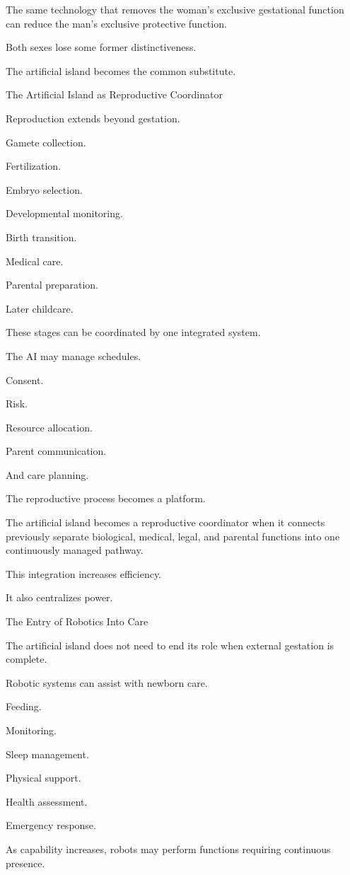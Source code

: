 The same technology that removes the woman’s exclusive gestational function can reduce the man’s exclusive protective function.

Both sexes lose some former distinctiveness.

The artificial island becomes the common substitute.

The Artificial Island as Reproductive Coordinator

Reproduction extends beyond gestation.

Gamete collection.

Fertilization.

Embryo selection.

Developmental monitoring.

Birth transition.

Medical care.

Parental preparation.

Later childcare.

These stages can be coordinated by one integrated system.

The AI may manage schedules.

Consent.

Risk.

Resource allocation.

Parent communication.

And care planning.

The reproductive process becomes a platform.

The artificial island becomes a reproductive coordinator when it connects previously separate biological, medical, legal, and parental functions into one continuously managed pathway.

This integration increases efficiency.

It also centralizes power.

The Entry of Robotics Into Care

The artificial island does not need to end its role when external gestation is complete.

Robotic systems can assist with newborn care.

Feeding.

Monitoring.

Sleep management.

Physical support.

Health assessment.

Emergency response.

As capability increases, robots may perform functions requiring continuous presence.


